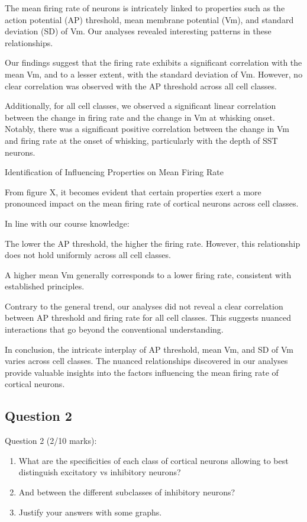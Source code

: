 \documentclass{IEEEtran}
\begin{document}
The mean firing rate of neurons is intricately linked to properties such as the action potential (AP) threshold, mean membrane potential (Vm), and standard deviation (SD) of Vm. Our analyses revealed interesting patterns in these relationships.

Our findings suggest that the firing rate exhibits a significant correlation with the mean Vm, and to a lesser extent, with the standard deviation of Vm. However, no clear correlation was observed with the AP threshold across all cell classes.

Additionally, for all cell classes, we observed a significant linear correlation between the change in firing rate and the change in Vm at whisking onset. Notably, there was a significant positive correlation between the change in Vm and firing rate at the onset of whisking, particularly with the depth of SST neurons.

Identification of Influencing Properties on Mean Firing Rate

From figure X, it becomes evident that certain properties exert a more pronounced impact on the mean firing rate of cortical neurons across cell classes.

In line with our course knowledge:

The lower the AP threshold, the higher the firing rate. However, this relationship does not hold uniformly across all cell classes.

A higher mean Vm generally corresponds to a lower firing rate, consistent with established principles.

Contrary to the general trend, our analyses did not reveal a clear correlation between AP threshold and firing rate for all cell classes. This suggests nuanced interactions that go beyond the conventional understanding.

In conclusion, the intricate interplay of AP threshold, mean Vm, and SD of Vm varies across cell classes. The nuanced relationships discovered in our analyses provide valuable insights into the factors influencing the mean firing rate of cortical neurons.


\subsection{Question 2}
Question 2 (2/10 marks):
\begin{enumerate}
  \item What are the specificities of each class of cortical neurons allowing to best distinguish excitatory vs inhibitory neurons?
  \item And between the different subclasses of inhibitory neurons?
  \item Justify your answers with some graphs.
\end{enumerate}
\end{document}
